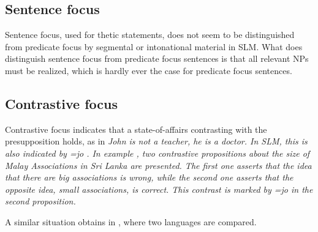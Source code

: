 \subsection{Sentence focus}\label{sec:disc:Sentencefocus}
Sentence focus, used for thetic statements, does not seem to be distinguished from predicate focus by segmental or intonational material in SLM. What does distinguish sentence focus from predicate focus sentences is that all relevant NPs must be realized, which is hardly ever the case for predicate focus sentences.

\subsection{Contrastive focus}\label{sec:disc:Contrastivefocus}
Contrastive focus indicates that a state-of-affairs contrasting with the presupposition holds, as in \em John is not a teacher, he is a doctor\em. In SLM, this is also indicated by \em =jo \em {}. In example , two contrastive propositions about the size of Malay Associations in Sri Lanka are presented. The first one asserts that the idea that there are big associations is wrong, while the second one asserts that the opposite idea, small associations, is correct. This contrast is marked by \em =jo \em in the second proposition.


A similar situation obtains in , where two languages are compared.



